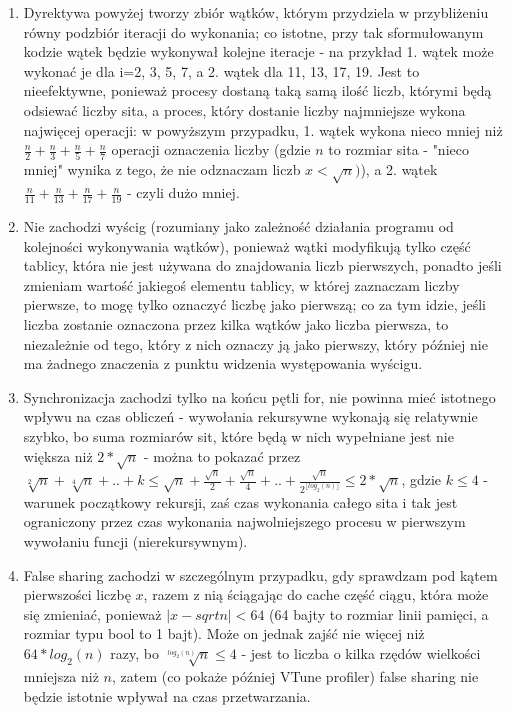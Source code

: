 \documentclass[12pt]{article}
\begin{document}
\begin {enumerate}
	\begin{enumerate}
		\item Dyrektywa powyżej tworzy zbiór wątków, którym przydziela w przybliżeniu równy podzbiór iteracji do wykonania; co istotne, przy tak sformułowanym kodzie wątek będzie wykonywał kolejne iteracje - na przykład 1. wątek może wykonać je dla i=2, 3, 5, 7, a 2. wątek dla 11, 13, 17, 19. Jest to nieefektywne, ponieważ procesy dostaną taką samą ilość liczb, którymi będą odsiewać liczby sita, a proces, który dostanie liczby najmniejsze wykona najwięcej operacji: w powyższym przypadku, 1. wątek wykona nieco mniej niż \(\frac{n}{2}+\frac{n}{3}+\frac{n}{5}+\frac{n}{7}\) operacji oznaczenia liczby (gdzie \(n\) to rozmiar sita - "nieco mniej" wynika z tego, że nie odznaczam liczb \(x<\sqrt{n})\)), a 2. wątek \(\frac{n}{11}+\frac{n}{13}+\frac{n}{17}+\frac{n}{19}\) - czyli dużo mniej.
		\item Nie zachodzi wyścig (rozumiany jako zależność działania programu od kolejności wykonywania wątków), ponieważ wątki modyfikują tylko część tablicy, która nie jest używana do znajdowania liczb pierwszych, ponadto jeśli zmieniam wartość jakiegoś elementu tablicy, w której zaznaczam liczby pierwsze, to mogę tylko oznaczyć liczbę jako pierwszą; co za tym idzie, jeśli liczba zostanie oznaczona przez kilka wątków jako liczba pierwsza, to niezależnie od tego, który z nich oznaczy ją jako pierwszy, który później nie ma żadnego znaczenia z punktu widzenia występowania wyścigu.
		\item Synchronizacja zachodzi tylko na końcu pętli for, nie powinna mieć istotnego wpływu na czas obliczeń - wywołania rekursywne wykonają się relatywnie szybko, bo suma rozmiarów sit, które będą w nich wypełniane jest nie większa niż \(2*\sqrt{n}\) - można to pokazać przez \(\sqrt[2]{n}+\sqrt[4]{n}+..+k\le\sqrt{n}+\frac{\sqrt{n}}{2}+\frac{\sqrt{n}}{4}+..+\frac{\sqrt{n}}{2^{\lfloor log_2(n) \rfloor}}\le 2*\sqrt{n}\), gdzie \(k \le 4\) - warunek początkowy rekursji, zaś czas wykonania całego sita i tak jest ograniczony przez czas wykonania najwolniejszego procesu w pierwszym wywołaniu funcji (nierekursywnym).
		\item False sharing zachodzi w szczególnym przypadku, gdy sprawdzam pod kątem pierwszości liczbę \(x\), razem z nią ściągając do cache część ciągu, która może się zmieniać, ponieważ \(|x-sqrt{n}|<64\) (64 bajty to rozmiar linii pamięci, a rozmiar typu bool to 1 bajt). Może on jednak zajść nie więcej niż \(64*log_2(n)\) razy, bo \(\sqrt[log_2(n)]{n}\le 4\) - jest to liczba o kilka rzędów wielkości mniejsza niż \(n\), zatem (co pokaże później VTune profiler) false sharing nie będzie istotnie wpływał na czas przetwarzania.
	\end{enumerate}
	
\end {enumerate}
\end{document}
